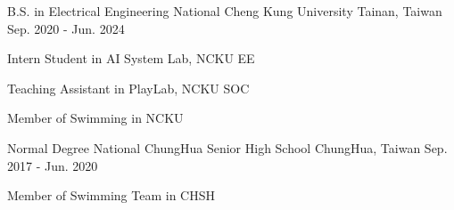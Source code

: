 

\begin{cventries}

  \cventry
  {B.S. in Electrical Engineering} %
  {National Cheng Kung University} %
  {Tainan, Taiwan} %
  {Sep. 2020 - Jun. 2024} %
  {
    \begin{cvitems} %
      \item {Intern Student in AI System Lab, NCKU EE}
      \item {Teaching Assistant in PlayLab, NCKU SOC}
      \item {Member of Swimming in NCKU}
    \end{cvitems}
  }

  \cventry
  {Normal Degree}
  {National ChungHua Senior High School}
  {ChungHua, Taiwan}
  {Sep. 2017 - Jun. 2020}
  {
    \begin{cvitems}
      \item {Member of Swimming Team in CHSH}
    \end{cvitems}
  }

\end{cventries}
